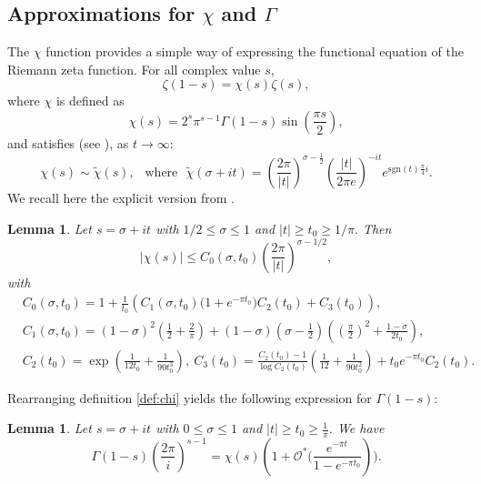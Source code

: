 \documentclass[11pt,letterpaper,oneside,reqno]{amsart}
\renewcommand{\^}[1]{\widehat{#1}}
\numberwithin{equation}{section}
\newtheorem{lemma}[theorem]{Lemma}
\theoremstyle{remark}
\begin{document}
\subsection{Approximations for $\chi$ and $\Gamma$}\label{sec:chi}
The $\chi$ function provides a simple way of expressing the functional equation of the Riemann zeta function. 
%
For all complex value $s$,
\[\zeta(1-s) = \chi(s) \zeta(s),\]
where $\chi$ is defined as 
\begin{equation}
    \chi(s) = 2^s \pi^{s-1} \Gamma(1-s) \sin\left(\frac{\pi s}{2}\right), \label{def:chi}
\end{equation}
and satisfies (see \cite[Eq. 4.12.3]{Titchmarsh}), as $t\to\infty$: 
\begin{equation} 
   \chi(s)\sim \tilde{\chi}(s),\ \ \text{   where} \ \ \ \tilde{\chi}(\sigma+it) =  \left(
    \frac{2\pi}{|t|}
    \right)^{\sigma-\frac{1}{2}} 
    \left(
    \frac{|t|}{2\pi e}
    \right)^{-it}
    e^{\text{sgn}(t)\frac{\pi}{4}i }. \label{eq:chi_asymptotic}
\end{equation}
%
We recall here the explicit version from \cite[Proposition 1] {Simonic2020}. 
\begin{lemma}\label{lem:bndchi-Simonic}
Let $s=\sigma+it$ with $1/2 \leq  \sigma \leq 1$ and $|t| \geq t_0 \geq 1/\pi.$ Then
\begin{equation}
|\chi(s)| \leq 
 C_0(\sigma,t_0) \left( \frac{2\pi}{|t|} \right)^{\sigma - 1/2} ,
\label{eq:chiBound}
\end{equation}
with 
\begin{align}
    \label{def-C0}
    & C_0(\sigma,t_0) = 
    1 + \frac{1}{t_0} \left(
    C_1(\sigma, t_0) \big(1 + e^{-\pi t_0}\big) C_2(t_0) + C_3(t_0)
    \right), 
\\
& C_1(\sigma,t_0) = (1-\sigma)^2 \left(\frac{1}{2}+\frac{2}{\pi}\right) + (1-\sigma)(\sigma-\frac{1}{2})\left(\left(\frac{\pi}{2}\right)^2+\frac{1-\sigma}{2t_0}\right)   ,\\
& C_2(t_0) = \exp\left(\frac{1}{12t_0}+\frac{1}{90t_0^3}\right),  \ 
C_3(t_0) = \frac{C_2(t_0)-1}{\log C_2(t_0)}\left(\frac{1}{12}+\frac{1}{90t_0^2}\right)+t_0e^{-\pi t_0}C_2(t_0) .\label{eq:Ci} 
\end{align}
\end{lemma}
%
Rearranging definition \eqref{def:chi} yields the following expression for $\Gamma(1-s)$:
\begin{lemma}\label{lem:gamma-chi2}
Let $s=\sigma+it$ with $0\leq \sigma \leq 1$ and $|t|\geq t_0\geq \frac{1}{\pi}$. We have \begin{equation*}
    \Gamma(1-s) \left(\dfrac{2\pi}{i}\right)^{s-1} = \chi(s) \left(1 + \mathcal{O}^*  \bigg(\dfrac{e^{-\pi t}}{1 - e^{-\pi t_0}}\right)\bigg) . 
\end{equation*}
\end{lemma}
%
\end{document}
